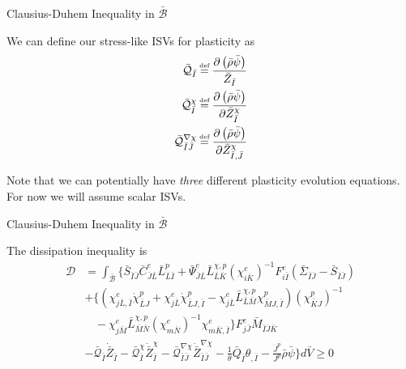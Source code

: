 \documentclass[11pt]{beamer}
\newcommand\defeq{\mathrel{\stackrel{\makebox[0pt]{\mbox{\normalfont\tiny def}}}{=}}}
\begin{document}
\begin{frame}{Clausius-Duhem Inequality in $\bar{\mathcal{B}}$}

We can define our stress-like ISVs for plasticity as
\begin{align*}
\bar{\mathcal{Q}}_{\bar{I}} &\defeq \frac{\partial \left(\bar{\rho}\bar{\psi}\right)}{\bar{Z}_{\bar{I}}}\\
\bar{\mathcal{Q}}_{\bar{I}}^{\chi} &\defeq \frac{\partial \left(\bar{\rho}\bar{\psi}\right)}{\partial \bar{Z}_{\bar{I}}^{\chi}}\\
\bar{\mathcal{Q}}_{\bar{I}\bar{J}}^{\nabla\chi} &\defeq\frac{\partial \left(\bar{\rho}\bar{\psi}\right)}{\partial \bar{Z}_{\bar{I},\bar{J}}^{\chi}}\\
\end{align*}

Note that we can potentially have \textit{three} different plasticity evolution equations. For now we will assume scalar ISVs.

\end{frame}

\begin{frame}{Clausius-Duhem Inequality in $\bar{\mathcal{B}}$}

The dissipation inequality is
\begin{align*}
\mathcal{D} &=  \int_{\bar{\mathcal{B}}} \bigg\{\bar{S}_{\bar{I}\bar{J}} \bar{C}_{\bar{J}\bar{L}}^e\bar{L}_{\bar{L}\bar{I}}^p + \bar{\Psi}_{\bar{J}\bar{L}}^e \bar{L}_{\bar{L}\bar{K}}^{\chi,p} \left(\chi_{i\bar{K}}^e\right)^{-1} F_{i\bar{I}}^e \left(\bar{\Sigma}_{\bar{I}\bar{J}} - \bar{S}_{\bar{I}\bar{J}}\right)\\ &+ \bigg\{\left(\chi_{j\bar{L},\bar{I}}^e \dot{\chi}_{\bar{L}J}^p + \chi_{j\bar{L}}^e\dot{\chi}_{\bar{L}J,\bar{I}}^p - \chi_{j\bar{L}}^e\bar{L}_{\bar{L}\bar{M}}^{\chi,p}\chi_{\bar{M}J,\bar{I}}^p\right)\left(\chi_{ \bar{K} J}^p\right)^{-1}\\
&\ \ \ \ -\chi_{j\bar{M}}^e \bar{L}_{\bar{M}\bar{N}}^{\chi,p} \left(\chi_{m\bar{N}}^e\right)^{-1} \chi_{m\bar{K},\bar{I}}^e\bigg\} F_{j\bar{J}}^e \bar{M}_{\bar{I}\bar{J}\bar{K}} \\
& - \bar{\mathcal{Q}}_{\bar{I}}\dot{\bar{Z}}_{\bar{I}} - \bar{\mathcal{Q}}_{\bar{I}}^{\chi}\dot{\bar{Z}}_{\bar{I}}^{\chi} - \bar{\mathcal{Q}}_{\bar{I}\bar{J}}^{\nabla\chi}\dot{\bar{Z}}_{\bar{I}\bar{J}}^{\nabla\chi}  - \frac{1}{\theta} \bar{Q}_{\bar{I}} \theta_{,\bar{I}} - \frac{\dot{J}^p}{J^p} \bar{\rho} \bar{\psi}\bigg\} d\bar{V}\geq 0\\
\end{align*}

\end{frame}
\end{document}
